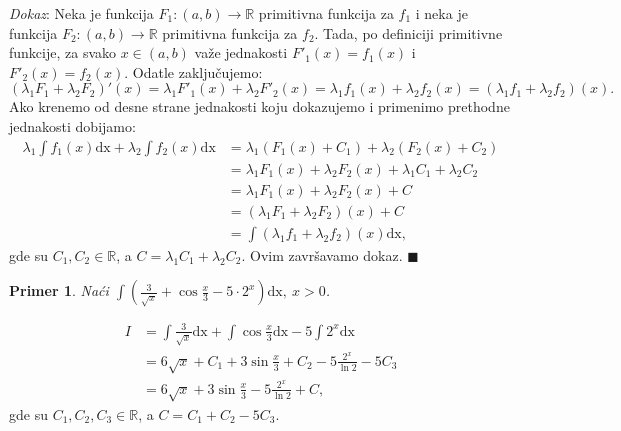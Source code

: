 \documentclass{article}
\newtheorem{prim}{Primer}[section]
\begin{document}
\textit{Dokaz}: Neka je funkcija $F_1: \left(a, b\right) \longrightarrow \mathbb{R}$
primitivna funkcija za $f_1$ i neka je funkcija $F_2: \left(a, b\right)
    \longrightarrow \mathbb{R}$ primitivna funkcija za $f_2$.
Tada, po definiciji primitivne funkcije, za svako $x\in\left(a,b\right)$ važe jednakosti
$F'_1\left(x\right) = f_1\left(x\right)$ i $F'_2\left(x\right) = f_2\left(x\right)$.
Odatle zaključujemo:
$$\left(\lambda_1 F_1 + \lambda_2 F_2\right)'\left(x\right) =
    \lambda_1 F'_1\left(x\right) + \lambda_2 F'_2\left(x\right) =
    \lambda_1 f_1\left(x\right) + \lambda_2 f_2\left(x\right) =
    \left(\lambda_1 f_1 + \lambda_2 f_2\right)\left(x\right).$$
Ako krenemo od desne strane jednakosti koju dokazujemo i
primenimo prethodne jednakosti dobijamo:
\begin{align*}
    \lambda_1\int f_1\left(x\right) \text{dx} + \lambda_2\int f_2\left(x\right) \text{dx} & =\lambda_1\left(F_1\left(x\right) + C_1\right) + \lambda_2\left(F_2\left(x\right) + C_2\right) \\
                                                                                          & =\lambda_1  F_1\left(x\right) + \lambda_2  F_2\left(x\right) + \lambda_1  C_1 + \lambda_2  C_2 \\
                                                                                          & =\lambda_1  F_1\left(x\right) + \lambda_2  F_2\left(x\right) + C                               \\
                                                                                          & =\left(\lambda_1 F_1 + \lambda_2 F_2\right)\left(x\right) + C                                  \\
                                                                                          & =\int \left(\lambda_1 f_1+ \lambda_2 f_2\right)\left(x\right)\text{dx},
\end{align*}
gde su $C_1,C_2\in\mathbb{R}$, a $C=\lambda_1C_1+\lambda_2C_2$. Ovim završavamo dokaz.
\null\hfill $\blacksquare$\par

\begin{primbox}
    \label{primer_1.6}
    \begin{prim}
        Naći $\displaystyle\int \left(\frac{3}{\sqrt{x}} +
            \cos\frac{x}{3} - 5\cdot 2^x\right)\text{dx},\ x > 0$.
    \end{prim}
    \begin{align*}
        I & = \int\frac{3}{\sqrt{x}} \text{dx} + \int \cos\frac{x}{3} \text{dx} - 5\int 2^x \text{dx}
        \\ & = 6\sqrt{x} + C_1 + 3\sin\frac{x}{3} + C_2 - 5\frac{2^x}{\ln{2}} - 5C_3
        \\ & = 6\sqrt{x} + 3\sin\frac{x}{3} - 5\frac{2^x}{\ln{2}} + C,
    \end{align*}
    gde su $C_1,C_2,C_3\in\mathbb{R}$, a $C=C_1+C_2-5C_3$.
\end{primbox}
\end{document}
